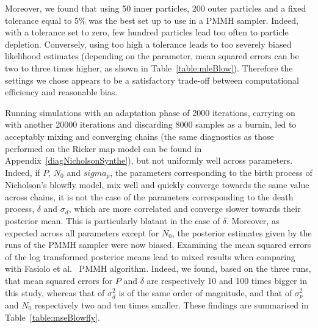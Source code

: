 \documentclass[12pt]{article}
\begin{document}
	
	Moreover, we found that using 50 inner particles, 200 outer particles and a fixed tolerance equal to 5\% was the best set up to use in a PMMH sampler. Indeed, with a tolerance set to zero, few hundred particles lead too often to particle depletion. Conversely, using too high a tolerance leads to too severely biased likelihood estimates (depending on the parameter, mean squared errors can be two to three times higher, as shown in Table~\ref{table:mleBlow}). Therefore the settings we chose appears to be a satisfactory trade-off between computational efficiency and reasonable bias.
	
	Running simulations with an adaptation phase of 2000 iterations, carrying on with another 20000 iterations and discarding 8000 samples as a burnin, led to acceptably mixing and converging chains (the same diagnostics as those performed on the Ricker map model can be found in Appendix~\ref{diagNicholsonSynthe}), but not uniformly well across parameters. Indeed, if $P$, $N_0$ and $sigma_p$, the parameters corresponding to the birth process of Nicholson's blowfly model, mix well and quickly converge towards the same value across chains, it is not the case of the parameters corresponding to the death process, $\delta$ and $\sigma_d$, which are more correlated and converge slower towards their posterior mean. This is particularly blatant in the case of $\delta$. Moreover, as expected across all parameters except for $N_0$, the posterior estimates given by the runs of the PMMH sampler were now biased. Examining the mean squared errors of the log transformed posterior means lead to mixed results when comparing with Fasiolo et al.~\cite{fasiolo2014statistical} PMMH algorithm. Indeed, we found, based on the three runs, that mean squared errors for $P$ and $\delta$ are respectively 10 and 100 times bigger in this study, whereas that of $\sigma_d^2$ is of the same order of magnitude, and that of $\sigma_p^2$ and $N_0$ respectively two and ten times smaller. These findings are summarised in Table~\ref{table:mseBlowfly}.
\end{document}
